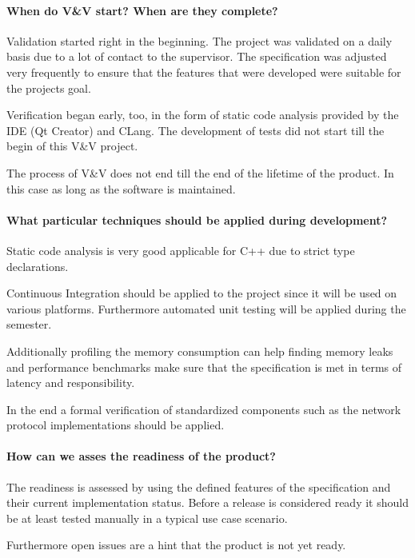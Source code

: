 \documentclass{scrartcl}
\begin{document}
\paragraph{When do V\&V start?  When are they complete?}

Validation started right in the beginning. The project was validated on a daily basis  due to a lot of contact to the supervisor. The specification was adjusted very frequently to ensure that the features that were developed were suitable for the projects goal.

Verification began early, too, in the form of static code analysis provided by the IDE (Qt Creator) and CLang. The development of tests did not start till the begin of this V\&V project.

The process of V\&V does not end till the end of the lifetime of the product. In this case as long as the software is maintained.

\paragraph{What particular techniques should be applied during development?}

Static code analysis is very good applicable for C++ due to strict type declarations. 

Continuous Integration should be applied to the project since it will be used on various platforms. Furthermore automated unit testing will be applied during the semester.

Additionally profiling the memory consumption can help finding memory leaks and performance benchmarks make sure that the specification is met in terms of latency and responsibility.

In the end a formal verification of standardized components such as the network protocol implementations should be applied.

\paragraph{How can we asses the readiness of the product?}

The readiness is assessed by using the defined features of the specification and their current implementation status. Before a release is considered ready it should be at least tested manually in a typical use case scenario.

Furthermore open issues are a hint that the product is not yet ready.
\end{document}
